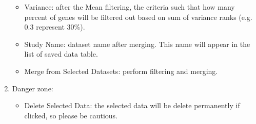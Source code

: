 \begin{enumerate}
\begin{itemize}
\item Variance: after the Mean filtering, the criteria such that how many percent of genes will be filtered out based on sum of variance ranks (e.g. 0.3 represent 30\%).
\item Study Name: dataset name after merging. This name will appear in the list of saved data table.
\item Merge from Selected Datasets: perform filtering and merging.
\end{itemize}
\item Danger zone:
\begin{itemize}
\item Delete Selected Data: the selected data will be delete permanently if clicked, so please be cautious.
\end{itemize}

\end{enumerate}



